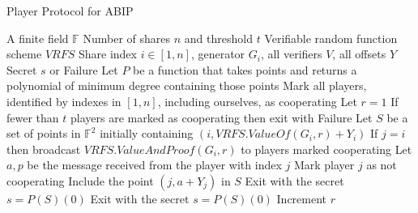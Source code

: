 \documentclass{dalcsthesis}
\begin{document}
\begin{algorithm}
  \caption{Player Protocol for ABIP}
  \label{alg:ABIP:Player}
  \begin{algorithmic}
    \INPUT A finite field $\mathbb{F}$
    \INPUT Number of shares $n$ and threshold $t$
    \INPUT Verifiable random function scheme $VRFS$
    \INPUT Share index $i \in [1, n]$, generator $G_i$, all verifiers $V$, all offsets $Y$
    \OUTPUT Secret $s$ or Failure
    \STATE Let $P$ be a function that takes points and returns a polynomial of minimum degree containing those points 
    \STATE Mark all players, identified by indexes in $[1, n]$, including ourselves, as cooperating
    \STATE Let $r = 1$
      \STATE If fewer than $t$ players are marked as cooperating then exit with Failure
      \STATE Let $S$ be a set of points in $\mathbb{F}^2$ initially containing $(i, VRFS.ValueOf(G_i, r) + Y_i)$
        \STATE If $j = i$ then broadcast $VRFS.ValueAndProof(G_i, r)$ to players marked cooperating
        \STATE Let $a, p$ be the message received from the player with index $j$
          \STATE Mark player $j$ as not cooperating
        \ELSE
          \STATE Include the point $(j, a + Y_j)$ in $S$
            \STATE Exit with the secret $s = P(S)(0)$
          \ENDIF
        \ENDIF
      \ENDFOR
        \STATE Exit with the secret $s = P(S)(0)$
      \ENDIF
      \STATE Increment $r$
    \ENDWHILE
  \end{algorithmic}
\end{algorithm}
\end{document}

